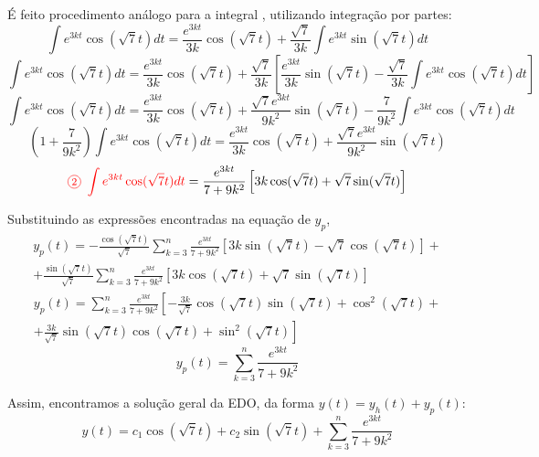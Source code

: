 \documentclass[oneside,12pt,a4paper]{report}
\begin{document}
\begin{resolucao}
    É feito procedimento análogo para a integral , utilizando integração por partes:
    \[\int e^{3kt}\cos(\sqrt{7}t)dt=\frac{e^{3kt}}{3k}\cos(\sqrt{7}t)+\frac{\sqrt{7}}{3k}\int e^{3kt}\sin(\sqrt{7}t)dt\]
    \[\int e^{3kt}\cos(\sqrt{7}t)dt=\frac{e^{3kt}}{3k}\cos(\sqrt{7}t)+\frac{\sqrt{7}}{3k}\left[\frac{e^{3kt}}{3k}\sin(\sqrt{7}t)-\frac{\sqrt{7}}{3k}\int e^{3kt}\cos(\sqrt{7}t)dt\right]\]
    \[\int e^{3kt}\cos(\sqrt{7}t)dt=\frac{e^{3kt}}{3k}\cos(\sqrt{7}t)+\frac{\sqrt{7}e^{3kt}}{9k^2}\sin(\sqrt{7}t)-\frac{7}{9k^2}\int e^{3kt}\cos(\sqrt{7}t)dt\]
    \[\left(1+\frac{7}{9k^2}\right)\int e^{3kt}\cos(\sqrt{7}t)dt=\frac{e^{3kt}}{3k}\cos(\sqrt{7}t)+\frac{\sqrt{7}e^{3kt}}{9k^2}\sin(\sqrt{7}t)\]
    \[\color{red}\text{\circled{2} }\int e^{3kt}\cos(\sqrt{7}t)dt\color{black}=\frac{e^{3kt}}{7+9k^2}\left[3k\cos(\sqrt{7}t)+\sqrt{7}\sin(\sqrt{7}t)\right]\]

    Substituindo as expressões encontradas na equação de $y_p$, 
    \begin{gather*}
        y_p(t)=-\frac{\cos(\sqrt{7}t)}{\sqrt{7}}\sum_{k=3}^{n}\frac{e^{3kt}}{7+9k^2}\left[3k\sin(\sqrt{7}t)-\sqrt{7}\cos(\sqrt{7}t)\right]+\\+\frac{\sin(\sqrt{7}t)}{\sqrt{7}}\sum_{k=3}^{n}\frac{e^{3kt}}{7+9k^2}\left[3k\cos(\sqrt{7}t)+\sqrt{7}\sin(\sqrt{7}t)\right]
    \end{gather*}
    \begin{gather*}
        y_p(t)=\sum_{k=3}^{n}\frac{e^{3kt}}{7+9k^2}\left[-\frac{3k}{\sqrt{7}}\cos(\sqrt{7}t)\sin(\sqrt{7}t)+\cos^2(\sqrt{7}t)\right.+\\\left.+\frac{3k}{\sqrt{7}}\sin(\sqrt{7}t)\cos(\sqrt{7}t)+\sin^2(\sqrt{7}t)\right]
    \end{gather*}
    \[y_p(t)=\sum_{k=3}^{n}\frac{e^{3kt}}{7+9k^2}\]

    Assim, encontramos a solução geral da EDO, da forma $y(t)=y_h(t)+y_p(t)$:
    \[\boxed{y(t)=c_1\cos(\sqrt{7}t)+c_2\sin(\sqrt{7}t)+\sum_{k=3}^{n}\frac{e^{3kt}}{7+9k^2}}\]

\end{resolucao}
\end{document}
